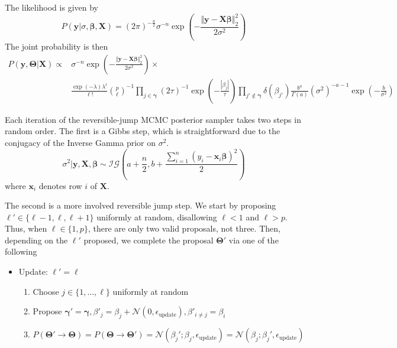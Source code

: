 \documentclass[a4paper,11pt]{article}
\begin{document}
The likelihood is given by
\begin{equation}
  P(\mathbf{y} | \sigma, \mathbf{\beta}, \mathbf{X} ) = (2\pi)^{-\frac{n}{2}} \sigma^{-n} \exp{\left(-\frac{\Vert\mathbf{y}-\mathbf{X}\mathbf{\beta}\Vert^{2}_{2}}{2\sigma^{2}}\right)}
\end{equation}
The joint probability is then
\begin{equation}
    \begin{aligned}
         P(\mathbf{y}, \mathbf{\Theta} | \mathbf{X} ) \propto &\sigma^{-n} \exp{\left(-\frac{\Vert\mathbf{y}-\mathbf{X}\mathbf{\beta}\Vert^{2}_{2}}{2\sigma^{2}}\right)} \times \\ 
         & \frac{\exp{(-\lambda)} \lambda^{\ell}}{\ell!} {p\choose \ell}^{-1} \prod_{j\in \mathbf{\gamma}} (2\tau)^{-1}\exp\left(-\frac{|\beta_{j}|}{\tau}\right) \prod_{j' \notin \mathbf{\gamma}} \delta(\beta_{j'}) \frac{b^{a}}{\Gamma(a)} (\sigma^{2})^{-a-1} \exp{\left(-\frac{b}{\sigma^{2}}\right)}
    \end{aligned}
    \label{eq:ex2_joint}
\end{equation}

Each iteration of the reversible-jump MCMC posterior sampler takes two steps in random order. The first is a Gibbs step, which is straightforward due to the conjugacy of the Inverse Gamma prior on $\sigma^{2}$.
\begin{equation}
    \sigma^{2} | \mathbf{y}, \mathbf{X}, \mathbf{\beta} \sim \mathcal{IG}\left(a + \frac{n}{2}, b + \frac{\sum_{i=1}^{n}(y_{i}-\mathbf{x}_{i}\mathbf{\beta})^{2} }{2}\right)
\end{equation}
where $\mathbf{x}_{i}$ denotes row $i$ of $\mathbf{X}$.

The second is a more involved reversible jump step. We start by proposing $\ell' \in \{\ell-1, \ell, \ell+1\}$ uniformly at random, disallowing $\ell<1$ and $\ell>p$. Thus, when $\ell \in \{1,p\}$, there are only two valid proposals, not three. Then, depending on the $\ell'$ proposed, we complete the proposal $\mathbf{\Theta}'$ via one of the following
\begin{itemize}
    \item Update: $\ell' = \ell$
    \begin{enumerate}
        \item Choose $j \in \{1, \ldots, \ell\}$ uniformly at random
        \item Propose $\mathbf{\gamma}' = \mathbf{\gamma}, \beta'_{j} = \beta_{j} + \mathcal{N}(0, \epsilon_{\text{update}}), \beta'_{i \neq j} = \beta_{i}$
        \item $P(\mathbf{\Theta}' \rightarrow \mathbf{\Theta}) = P(\mathbf{\Theta} \rightarrow \mathbf{\Theta}')=\mathcal{N}(\beta_{j}'; \beta_{j},\epsilon_{\text{update}})=\mathcal{N}(\beta_{j}; \beta_{j}',\epsilon_{\text{update}})$
    \end{enumerate}
\end{itemize}
\end{document}
